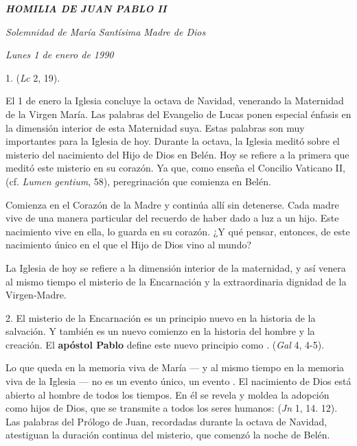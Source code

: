 \begin{body}
	\emph{\textbf{HOMILIA DE JUAN PABLO II}}

	\emph{Solemnidad de María Santísima Madre de Dios}

	\emph{Lunes 1 de enero de 1990}

	1.  (\emph{Lc} 2, 19).

	El 1 de enero la Iglesia concluye la octava de Navidad, venerando la Maternidad de la Virgen María. Las palabras del Evangelio de Lucas ponen especial énfasis en la dimensión interior de esta Maternidad suya. Estas palabras son muy importantes para la Iglesia de hoy. Durante la octava, la Iglesia meditó sobre el misterio del nacimiento del Hijo de Dios en Belén. Hoy se refiere a la primera que meditó este misterio en su corazón. Ya que, como enseña el Concilio Vaticano II,  (cf. \emph{Lumen gentium}, 58), peregrinación que comienza en Belén.

	Comienza en el Corazón de la Madre y continúa allí sin detenerse. Cada madre vive de una manera particular del recuerdo de haber dado a luz a un hijo. Este nacimiento vive en ella, lo guarda en su corazón. ¿Y qué pensar, entonces, de este nacimiento único en el que el Hijo de Dios vino al mundo?

	La Iglesia de hoy se refiere a la dimensión interior de la maternidad, y así venera al mismo tiempo el misterio de la Encarnación y la extraordinaria dignidad de la Virgen-Madre.

	2. El misterio de la Encarnación es un principio nuevo en la historia de la salvación. Y también es un nuevo comienzo en la historia del hombre y la creación. El \textbf{apóstol Pablo} define este nuevo principio como .  (\emph{Gal} 4, 4-5).

	Lo que queda en la memoria viva de María --- y al mismo tiempo en la memoria viva de la Iglesia --- no es un evento único, un evento . El nacimiento de Dios está abierto al hombre de todos los tiempos. En él se revela y moldea la adopción como hijos de Dios, que se transmite a todos los seres humanos:  (\emph{Jn} 1, 14. 12). Las palabras del Prólogo de Juan, recordadas durante la octava de Navidad, atestiguan la duración continua del misterio, que comenzó la noche de Belén.


\end{body}

